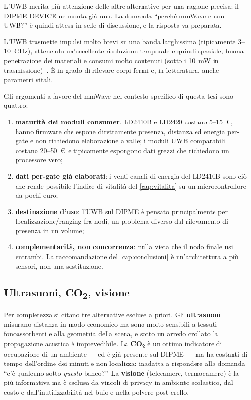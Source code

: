 L'UWB merita più attenzione delle altre alternative per una ragione precisa: il
DIPME-DEVICE ne monta già uno. La domanda ``perché mmWave e non UWB?'' è quindi
attesa in sede di discussione, e la risposta va preparata.

L'UWB trasmette impulsi molto brevi su una banda larghissima (tipicamente
3--10~GHz), ottenendo un'eccellente risoluzione temporale e quindi spaziale, buona
penetrazione dei materiali e consumi molto contenuti (sotto i 10~mW in
trasmissione)~\cite{rfwireless}. È in grado di rilevare corpi fermi e, in
letteratura, anche parametri vitali.

Gli argomenti a favore del mmWave nel contesto specifico di questa tesi sono
quattro:

\begin{enumerate}[leftmargin=1.8em,itemsep=2pt]
  \item \textbf{maturità dei moduli consumer}: LD2410B e LD2420 costano 5--15~\euro,
        hanno firmware che espone direttamente presenza, distanza ed energia
        per-gate e non richiedono elaborazione a valle; i moduli UWB comparabili
        costano 20--50~\euro\ e tipicamente espongono dati grezzi che richiedono un
        processore vero;
  \item \textbf{dati per-gate già elaborati}: i venti canali di energia del
        LD2410B sono ciò che rende possibile l'indice di vitalità del
        \cref{cap:vitalita} su un microcontrollore da pochi euro;
  \item \textbf{destinazione d'uso}: l'UWB sul DIPME è pensato principalmente per
        localizzazione/ranging fra nodi, un problema diverso dal rilevamento di
        presenza in un volume;
  \item \textbf{complementarità, non concorrenza}: nulla vieta che il nodo finale
        usi entrambi. La raccomandazione del \cref{cap:conclusioni} è
        un'architettura a più sensori, non una sostituzione.
\end{enumerate}

\subsection{Ultrasuoni, CO\textsubscript{2}, visione}

Per completezza si citano tre alternative escluse a priori.
Gli \textbf{ultrasuoni} misurano distanza in modo economico ma sono molto
sensibili a tessuti fonoassorbenti e alla geometria della scena, e sotto un arredo
crollato la propagazione acustica è imprevedibile.
La \textbf{CO\textsubscript{2}} è un ottimo indicatore di occupazione di un
ambiente --- ed è già presente sul DIPME --- ma ha costanti di tempo dell'ordine
dei minuti e non localizza: inadatta a rispondere alla domanda ``c'è qualcuno
sotto \emph{questo} banco?''.
La \textbf{visione} (telecamere, termocamere) è la più informativa ma è esclusa da
vincoli di privacy in ambiente scolastico, dal costo e dall'inutilizzabilità nel
buio e nella polvere post-crollo.

